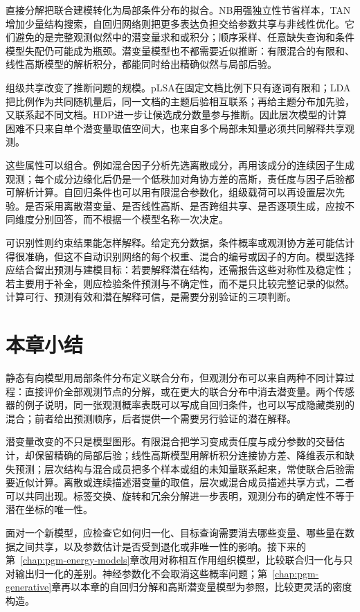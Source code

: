 直接分解把联合建模转化为局部条件分布的拟合。NB用强独立性节省样本，TAN增加少量结构搜索，自回归网络则把更多表达负担交给参数共享与非线性优化。它们避免的是完整观测似然中的潜变量求和或积分；顺序采样、任意缺失查询和条件模型失配仍可能成为瓶颈。潜变量模型也不都需要近似推断：有限混合的有限和、线性高斯模型的解析积分，都能同时给出精确似然与局部后验。

组级共享改变了推断问题的规模。pLSA在固定文档比例下只有逐词有限和；LDA把比例作为共同随机量后，同一文档的主题后验相互联系；再给主题分布加先验，又联系起不同文档。HDP进一步让候选成分数量参与推断。因此层次模型的计算困难不只来自单个潜变量取值空间大，也来自多个局部未知量必须共同解释共享观测。

这些属性可以组合。例如混合因子分析先选离散成分，再用该成分的连续因子生成观测；每个成分边缘化后仍是一个低秩加对角协方差的高斯，责任度与因子后验都可解析计算。自回归条件也可以用有限混合参数化，组级载荷可以再设置层次先验。是否采用离散潜变量、是否线性高斯、是否跨组共享、是否逐项生成，应按不同维度分别回答，而不根据一个模型名称一次决定。

可识别性则约束结果能怎样解释。给定充分数据，条件概率或观测协方差可能估计得很准确，但这不自动识别网络的每个权重、混合的编号或因子的方向。模型选择应结合留出预测与建模目标：若要解释潜在结构，还需报告这些对称性及稳定性；若主要用于补全，则应检验条件预测与不确定性，而不是只比较完整记录的似然。计算可行、预测有效和潜在解释可信，是需要分别验证的三项判断。

\section{本章小结}
\label{sec:pgm-static-directed-summary}

静态有向模型用局部条件分布定义联合分布，但观测分布可以来自两种不同计算过程：直接评价全部观测节点的分解，或在更大的联合分布中消去潜变量。两个传感器的例子说明，同一张观测概率表既可以写成自回归条件，也可以写成隐藏类别的混合；前者给出预测顺序，后者提供一个需要另行验证的潜在解释。

潜变量改变的不只是模型图形。有限混合把学习变成责任度与成分参数的交替估计，却保留精确的局部后验；线性高斯模型用解析积分连接协方差、降维表示和缺失预测；层次结构与混合成员把多个样本或组的未知量联系起来，常使联合后验需要近似计算。离散或连续描述潜变量的取值，层次或混合成员描述共享方式，二者可以共同出现。标签交换、旋转和冗余分解进一步表明，观测分布的确定性不等于潜在坐标的唯一性。

面对一个新模型，应检查它如何归一化、目标查询需要消去哪些变量、哪些量在数据之间共享，以及参数估计是否受到退化或非唯一性的影响。接下来的第~\ref{chap:pgm-energy-models}章改用对称相互作用组织模型，比较联合归一化与只对输出归一化的差别。神经参数化不会取消这些概率问题；第~\ref{chap:pgm-generative}章再以本章的自回归分解和高斯潜变量模型为参照，比较更灵活的密度构造。
